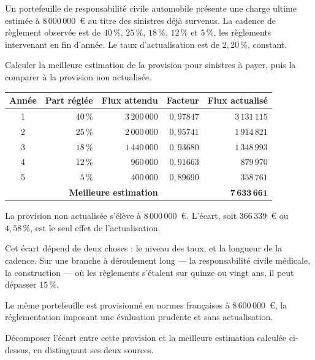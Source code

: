 \begin{exercice}
Un portefeuille de responsabilité civile automobile présente une charge ultime
estimée à $8\,000\,000$~\euro{} au titre des sinistres déjà survenus. La cadence
de règlement observée est de $40\,\%$, $25\,\%$, $18\,\%$, $12\,\%$ et $5\,\%$,
les règlements intervenant en fin d'année. Le taux d'actualisation est de
$2{,}20\,\%$, constant.

Calculer la meilleure estimation de la provision pour sinistres à payer, puis la
comparer à la provision non actualisée.
\end{exercice}

\begin{corrige}
\begin{center}\small
\begin{tabular}{crrrr}
\toprule
Année & Part réglée & Flux attendu & Facteur & Flux actualisé \\
\midrule
1 & $40\,\%$ & $3\,200\,000$ & $0{,}97847$ & $3\,131\,115$ \\
2 & $25\,\%$ & $2\,000\,000$ & $0{,}95741$ & $1\,914\,821$ \\
3 & $18\,\%$ & $1\,440\,000$ & $0{,}93680$ & $1\,348\,993$ \\
4 & $12\,\%$ & $960\,000$    & $0{,}91663$ & $879\,970$ \\
5 & $5\,\%$  & $400\,000$    & $0{,}89690$ & $358\,761$ \\
\midrule
\multicolumn{3}{r}{\textbf{Meilleure estimation}} & & $\mathbf{7\,633\,661}$ \\
\bottomrule
\end{tabular}
\end{center}
La provision non actualisée s'élève à $8\,000\,000$~\euro. L'écart, soit
$366\,339$~\euro{} ou $4{,}58\,\%$, est le seul effet de l'actualisation.

\medskip
Cet écart dépend de deux choses : le niveau des taux, et la longueur de la
cadence. Sur une branche à déroulement long --- la responsabilité civile
médicale, la construction --- où les règlements s'étalent sur quinze ou vingt
ans, il peut dépasser $15\,\%$.
\end{corrige}

\begin{exercice}
Le même portefeuille est provisionné en normes françaises à $8\,600\,000$~\euro,
la réglementation imposant une évaluation prudente et sans actualisation.

Décomposer l'écart entre cette provision et la meilleure estimation calculée
ci-dessus, en distinguant ses deux sources.
\end{exercice}

